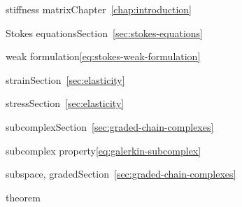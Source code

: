 \par\noindent\hspace*{0em}\label{index:stiffness-matrix}{stiffness matrix}\quad Chapter~\ref{chap:introduction}

\par\noindent\hspace*{0em}\label{index:stokes-equations}{Stokes equations}\quad Section~\ref{sec:stokes-equations}

\par\noindent\hspace*{1em}\label{index:stokes-equations-weak-formulation}{weak formulation}\quad \eqref{eq:stokes-weak-formulation}

\par\noindent\hspace*{0em}\label{index:strain}{strain}\quad Section~\ref{sec:elasticity}

\par\noindent\hspace*{0em}\label{index:stress}{stress}\quad Section~\ref{sec:elasticity}

\par\noindent\hspace*{0em}\label{index:subcomplex}{subcomplex}\quad Section~\ref{sec:graded-chain-complexes}

\par\noindent\hspace*{0em}\label{index:subcomplex-property}{subcomplex property}\quad \eqref{eq:galerkin-subcomplex}

\par\noindent\hspace*{0em}\label{index:subspace-graded}{subspace, graded}\quad Section~\ref{sec:graded-chain-complexes}

\par\noindent\hspace*{0em}\label{index:theorem}{theorem}


